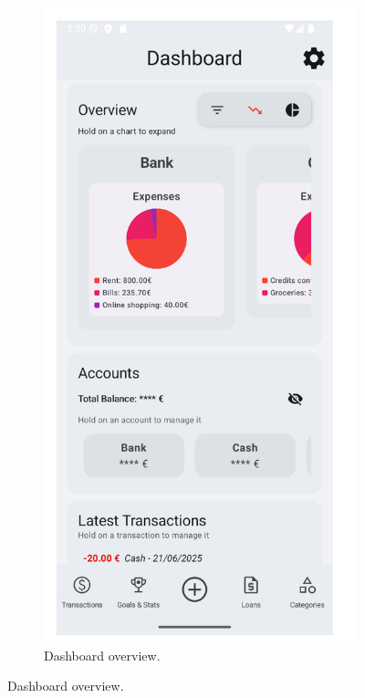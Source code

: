\documentclass[a4paper,12pt]{article}
\begin{document}
\begin{figure}[H]
    \centering
    \begin{subfigure}[b]{0.23\textwidth}
        \includegraphics[width=\textwidth]{dashboard.png}
        \caption{Dashboard overview.}

\end{subfigure}
\end{figure}
\end{document}
